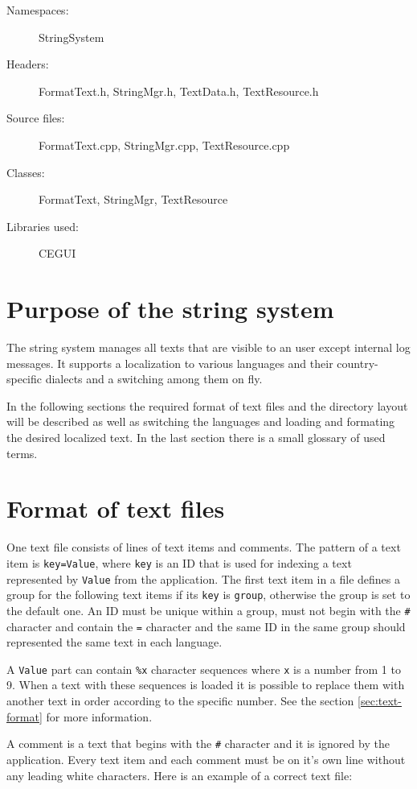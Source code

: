 \begin{description}
  \item[Namespaces:] StringSystem
  \item[Headers:] FormatText.h, StringMgr.h, TextData.h, TextResource.h
  \item[Source files:] FormatText.cpp, StringMgr.cpp, TextResource.cpp
  \item[Classes:] FormatText, StringMgr, TextResource
  \item[Libraries used:] CEGUI
\end{description}

\section{Purpose of the string system}

The string system manages all texts that are visible to an user except internal log messages. It supports a localization to various languages and their country-specific dialects and a switching among them on fly.

In the following sections the required format of text files and the directory layout will be described as well as switching the languages and loading and formating the desired localized text. In the last section there is a small glossary of used terms.

\section{Format of text files}

One text file consists of lines of text items and comments. The pattern of a text item is \verb/key=Value/, where \verb/key/ is an ID that is used for indexing a text represented by \verb/Value/ from the application. The first text item in a file defines a group for the following text items if its \verb/key/ is \verb/group/, otherwise the group is set to the default one. An ID must be unique within a group, must not begin with the \verb/#/ character and contain the \verb/=/ character and the same ID in the same group should represented the same text in each language.

A \verb/Value/ part can contain \verb/%x/ character sequences where \verb/x/ is a number from 1 to 9. When a text with these sequences is loaded it is possible to replace them with another text in order according to the specific number. See the section \ref{sec:text-format} for more information.

A comment is a text that begins with the \verb/#/ character and it is ignored by the application. Every text item and each comment must be on it's own line without any leading white characters. Here is an example of a correct text file:

